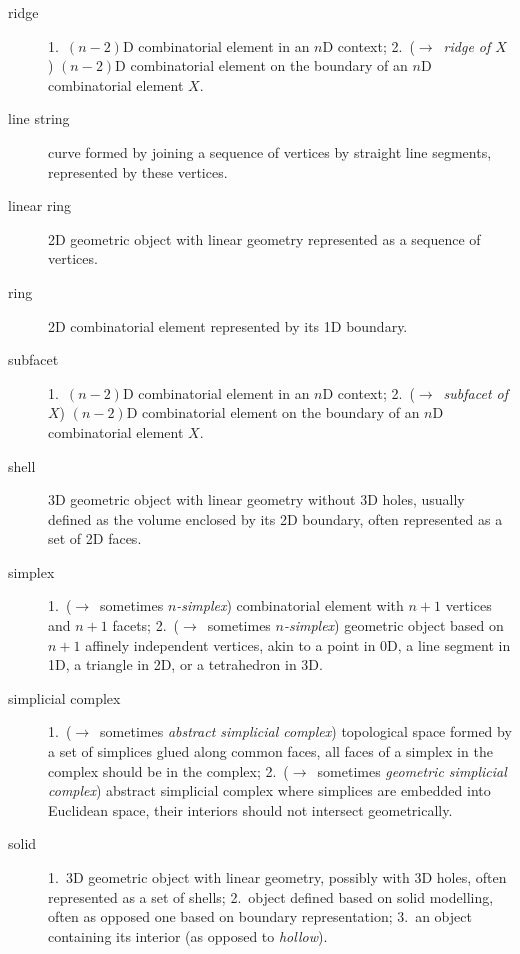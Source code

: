 \begin{multicols}{2}
\begin{description}
\item[ridge]
1.\ $(n-2)$D combinatorial element in an $n$D context;
2.\ ($\rightarrow$\ \emph{ridge of $X$}) $(n-2)$D combinatorial element on the boundary of an $n$D combinatorial element $X$.

\item[line string]
curve formed by joining a sequence of vertices by straight line segments, represented by these vertices.

\item[linear ring]
2D geometric object with linear geometry represented as a sequence of vertices.

\item[ring]
2D combinatorial element represented by its 1D boundary.

\item[subfacet]
1.\ $(n-2)$D combinatorial element in an $n$D context;
2.\ ($\rightarrow$\ \emph{subfacet of $X$}) $(n-2)$D combinatorial element on the boundary of an $n$D combinatorial element $X$.

\item[shell]
3D geometric object with linear geometry without 3D holes, usually defined as the volume enclosed by its 2D boundary, often represented as a set of 2D faces.

\item[simplex]
1.\ ($\rightarrow$\ sometimes \emph{$n$-simplex}) combinatorial element with $n+1$ vertices and $n+1$ facets;
2.\ ($\rightarrow$\ sometimes \emph{$n$-simplex}) geometric object based on $n+1$ affinely independent vertices, akin to a point in 0D, a line segment in 1D, a triangle in 2D, or a tetrahedron in 3D.

\item[simplicial complex]
1.\ ($\rightarrow$\ sometimes \emph{abstract simplicial complex}) topological space formed by a set of simplices glued along common faces, all faces of a simplex in the complex should be in the complex;
2.\ ($\rightarrow$\ sometimes \emph{geometric simplicial complex}) abstract simplicial complex where simplices are embedded into Euclidean space, their interiors should not intersect geometrically.

\item[solid]
1.\ 3D geometric object with linear geometry, possibly with 3D holes, often represented as a set of shells;
2.\ object defined based on solid modelling, often as opposed one based on boundary representation;
3.\ an object containing its interior (as opposed to \emph{hollow}).


\end{description}
\end{multicols}
